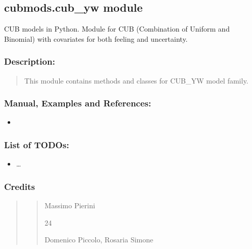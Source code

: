 \documentclass[letterpaper,10pt,english]{sphinxmanual}
\begin{document}
\subsection{cubmods.cub\_yw module}
\label{\detokenize{cubmods:module-cubmods.cub_yw}}\label{\detokenize{cubmods:cubmods-cub-yw-module}}\label{\detokenize{cubmods:cubyw-module}}
\sphinxAtStartPar
CUB models in Python.
Module for CUB (Combination of Uniform
and Binomial) with covariates
for both feeling and uncertainty.


\subsubsection{Description:}
\label{\detokenize{cubmods:id11}}\begin{quote}

\sphinxAtStartPar
This module contains methods and classes
for CUB\_YW model family.
\end{quote}


\subsubsection{Manual, Examples and References:}
\label{\detokenize{cubmods:id12}}\begin{itemize}
\item {} 
\sphinxAtStartPar
{}

\end{itemize}


\subsubsection{List of TODOs:}
\label{\detokenize{cubmods:id13}}\begin{itemize}
\item {} 
\sphinxAtStartPar
…

\end{itemize}


\subsubsection{Credits}
\label{\detokenize{cubmods:id14}}\begin{quote}
\begin{quote}\begin{description}
\sphinxAtStartPar
Massimo Pierini

\sphinxhyphen{}24

\sphinxAtStartPar
Domenico Piccolo, Rosaria Simone

\sphinxAtStartPar
{}

\end{description}\end{quote}
\end{quote}
\end{document}
